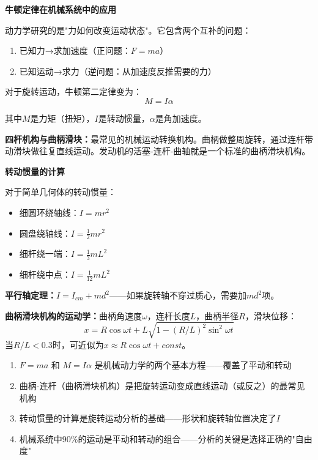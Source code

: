 \documentclass[a4paper,11pt]{ctexbook}
\newenvironment{qualitative}{
  \vspace{0.3cm}
  \noindent\begin{tcolorbox}[colback=themeblue!5!white,colframe=themeblue!60!black,title=\textcolor{themeblue}{\textbf{定性分析}}]
  \vspace{0.1cm}
}{\end{tcolorbox}\vspace{0.3cm}}
\newenvironment{quantitative}{
  \vspace{0.3cm}
  \noindent\begin{tcolorbox}[colback=quant!5!white,colframe=quant!60!black,title=\textcolor{quant}{\textbf{定量分析}}]
  \vspace{0.1cm}
}{\end{tcolorbox}\vspace{0.3cm}}
\newenvironment{lessonsummary}{
  \vspace{0.3cm}
  \noindent\begin{tcolorbox}[colback=summarybg,colframe=green!50!black,title=\textbf{\textcolor{green!50!black}{总结}}]
  \vspace{0.1cm}
}{\end{tcolorbox}\vspace{0.3cm}}
\begin{document}
\begin{qualitative}
\textbf{牛顿定律在机械系统中的应用}

动力学研究的是"力如何改变运动状态"。它包含两个互补的问题：
\begin{enumerate}
  \item 已知力→求加速度（正问题：$F=ma$）
  \item 已知运动→求力（逆问题：从加速度反推需要的力）
\end{enumerate}

对于旋转运动，牛顿第二定律变为：
\[
M = I\alpha
\]

其中$M$是力矩（扭矩），$I$是转动惯量，$\alpha$是角加速度。

\textbf{四杆机构与曲柄滑块：}最常见的机械运动转换机构。曲柄做整周旋转，通过连杆带动滑块做往复直线运动。发动机的活塞-连杆-曲轴就是一个标准的曲柄滑块机构。
\end{qualitative}

\begin{quantitative}
\textbf{转动惯量的计算}

对于简单几何体的转动惯量：
\begin{itemize}
  \item 细圆环绕轴线：$I = mr^2$
  \item 圆盘绕轴线：$I = \frac12 mr^2$
  \item 细杆绕一端：$I = \frac13 mL^2$
  \item 细杆绕中点：$I = \frac{1}{12} mL^2$
\end{itemize}

\textbf{平行轴定理：}$I = I_{cm} + md^2$——如果旋转轴不穿过质心，需要加$md^2$项。

\textbf{曲柄滑块机构的运动学：}曲柄角速度$\omega$，连杆长度$L$，曲柄半径$R$，滑块位移：
\[
x = R\cos\omega t + L\sqrt{1 - (R/L)^2\sin^2\omega t}
\]
当$R/L < 0.3$时，可近似为$x \approx R\cos\omega t + const$。
\end{quantitative}

\begin{lessonsummary}
\begin{enumerate}
  \item $F=ma$ 和 $M=I\alpha$ 是机械动力学的两个基本方程——覆盖了平动和转动
  \item 曲柄-连杆（曲柄滑块机构）是把旋转运动变成直线运动（或反之）的最常见机构
  \item 转动惯量的计算是旋转运动分析的基础——形状和旋转轴位置决定了$I$
  \item 机械系统中90\%的运动是平动和转动的组合——分析的关键是选择正确的"自由度"
\end{enumerate}
\end{lessonsummary}
\end{document}
